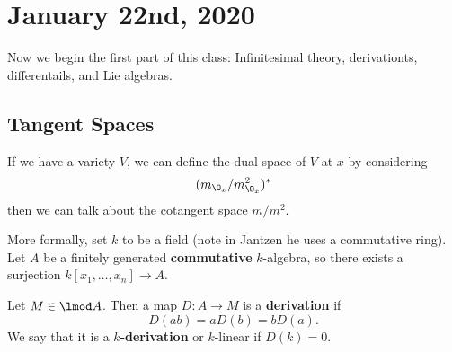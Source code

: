 \documentclass[12pt]{article}
\begin{document}
\section{January 22nd, 2020}
Now we begin the first part of this class: Infinitesimal theory, derivationts, differentails, and Lie algebras.

\subsection{Tangent Spaces}
If we have a variety $V$, we can define the dual space of $V$ at $x$ by considering 
\[(m_{\O_x}/m^2_{\O_x})^\ast\]
then we can talk about the cotangent space $m/m^2$.

More formally, set $k$ to be a field (note in Jantzen he uses a commutative ring). Let $A$ be a finitely generated \textbf{commutative} $k$-algebra,
so there exists a surjection $k[x_1,\dots,x_n]\to A$. 
\begin{defn}
	Let $M\in\lmod A$. Then a map $D:A\to M$ is a \textbf{derivation} if 
	\[D(ab)=aD(b)=bD(a).\]
	We say that it is a \textbf{$k$-derivation} or $k$-linear if $D(k)=0$. 
\end{defn}
\end{document}
